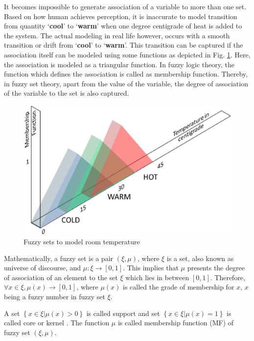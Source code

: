  It becomes impossible to generate association  of a variable to more than one set. Based on how human achieves perception, it is inaccurate to model transition from quantity `\textbf{cool}' to `\textbf{warm}' when one degree centigrade of heat is added to the system. The actual modeling in real life however, occurs with a smooth transition or drift from `\textbf{cool}' to `\textbf{warm}'. This transition can be captured if the association itself can be modeled using some functions as depicted in Fig. \ref{fig:Fig5_f_set}. Here, the association is modeled as a triangular function. In fuzzy logic theory, the function which defines the association is called as membership function. Thereby, in fuzzy set theory, apart from the value of the variable, the degree of association of the variable to the set is also captured.
\begin{figure}[h]
\centering
\includegraphics[width=0.8\linewidth]{Chapter1/chapter1/Fig5_f_set}
\caption{Fuzzy sets to model room temperature}
\label{fig:Fig5_f_set}
\end{figure}

Mathematically, a fuzzy set is a pair $ \left( {\xi ,\mu } \right) $, where $ \xi $ is a set, also known as universe of discourse, and $ \mu :\xi  \to \left[ {0,1} \right] $. This implies that $\mu$ presents the degree of association of an element to the set $\xi$ which lies in between $\left[ 0,1\right]  $. Therefore, $ \forall x \in \xi ,\mu \left( x \right) \to [0,1] $, where $ \mu \left( x \right) $ is called the grade of membership for $ x $, $ x $ being a fuzzy number in fuzzy set $\xi$.

A set $\left\{ {x \in \xi |\mu \left( x \right) > 0} \right\}$ is called support and set $\left\{ {x \in \xi |\mu \left( x \right) = 1} \right\}$ is called core or kernel \cite{bookBogdan2006a,Ross2010}. The function $ \mu $ is called membership function (MF) of fuzzy set $ \left( {\xi ,\mu } \right) $\cite{bookBogdan2006a,Ross2010}.

